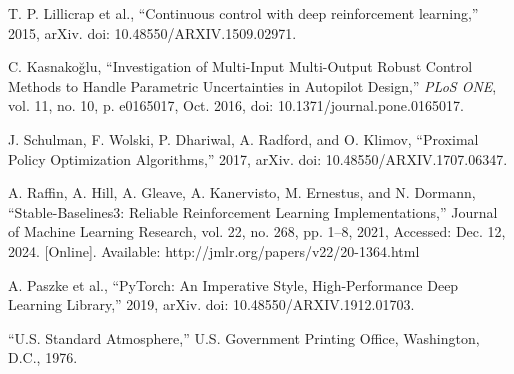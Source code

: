 \documentclass[lettersize,journal]{IEEEtran}
\begin{document}
\begin{thebibliography}{1}
T. P. Lillicrap et al., ``Continuous control with deep reinforcement learning,'' 2015, arXiv. doi: 10.48550/ARXIV.1509.02971.

C. Kasnakoğlu, ``Investigation of Multi-Input Multi-Output Robust Control Methods to Handle Parametric Uncertainties in Autopilot Design,'' \textit{PLoS ONE}, vol. 11, no. 10, p. e0165017, Oct. 2016, doi: 10.1371/journal.pone.0165017.

J. Schulman, F. Wolski, P. Dhariwal, A. Radford, and O. Klimov, “Proximal Policy Optimization Algorithms,” 2017, arXiv. doi: 10.48550/ARXIV.1707.06347.

A. Raffin, A. Hill, A. Gleave, A. Kanervisto, M. Ernestus, and N. Dormann, ``Stable-Baselines3: Reliable Reinforcement Learning Implementations,'' Journal of Machine Learning Research, vol. 22, no. 268, pp. 1–8, 2021, Accessed: Dec. 12, 2024. [Online]. Available: http://jmlr.org/papers/v22/20-1364.html

A. Paszke et al., ``PyTorch: An Imperative Style, High-Performance Deep Learning Library,'' 2019, arXiv. doi: 10.48550/ARXIV.1912.01703.

``U.S. Standard Atmosphere,'' U.S. Government Printing Office, Washington, D.C., 1976.

\end{thebibliography}

\newpage
\end{document}
